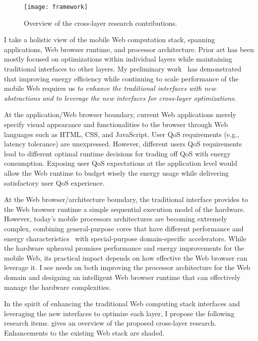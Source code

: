 \begin{figure}[t]
  \centering
  \texttt{[image: framework]}
  \caption{\small{Overview of the cross-layer research contributions.}}
  \label{fig:framework}
\end{figure}

I take a holistic view of the mobile Web computation stack, spanning applications, Web browser runtime, and processor architecture. Prior art has been mostly focused on optimizations within individual layers while maintaining traditional interfaces to other layers. My preliminary work~\cite{big-little,zhu2014exploiting,zhu2015role,webcore,ebs,greenweb,mobilecpu,eve-char} has demonstrated that improving energy efficiency while continuing to scale performance of the mobile Web requires us \textit{to enhance the traditional interfaces with new abstractions and to leverage the new interfaces for cross-layer optimizations}.

At the application/Web browser boundary, current Web applications merely specify visual appearance and functionalities to the browser through Web languages such as HTML, CSS, and JavaScript. User QoS requirements (e.g., latency tolerance) are unexpressed. However, different users QoS requirements lead to different optimal runtime decisions for trading off QoS with energy consumption. Exposing user QoS expectations at the application level would allow the Web runtime to budget wisely the energy usage while delivering satisfactory user QoS experience.

At the Web browser/architecture boundary, the traditional interface provides to the Web browser runtime a simple sequential execution model of the hardware.  However, today's mobile processors architectures are becoming extremely complex, combining general-purpose cores that have different performance and energy characteristics~\cite{single-ISA} with special-purpose domain-specific accelerators. While the hardware upheaval promises performance and energy improvements for the mobile Web, its practical impact depends on how effective the Web browser can leverage it. I see needs on both improving the processor architecture for the Web domain and designing an intelligent Web browser runtime that can effectively manage the hardware complexities.

In the spirit of enhancing the traditional Web computing stack interfaces and leveraging the new interfaces to optimize each layer, I propose the following research items.  gives an overview of the proposed cross-layer research. Enhancements to the existing Web stack are shaded.

